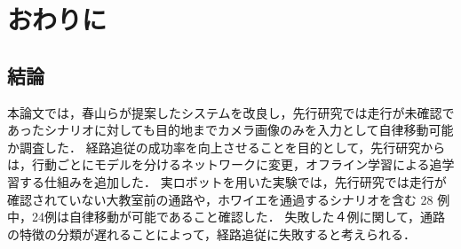 \chapter{おわりに}
\label{chap:end}
\section{結論}
本論文では，春山らが提案したシステムを改良し，先行研究では走行が未確認であったシナリオに対しても目的地までカメラ画像のみを入力として自律移動可能か調査した．
経路追従の成功率を向上させることを目的として，先行研究からは，行動ごとにモデルを分けるネットワークに変更，オフライン学習による追学習する仕組みを追加した．
実ロボットを用いた実験では，先行研究では走行が確認されていない大教室前の通路や，ホワイエを通過するシナリオを含む 28 例中，24例は自律移動が可能であること確認した．
失敗した４例に関して，通路の特徴の分類が遅れることによって，経路追従に失敗すると考えられる．